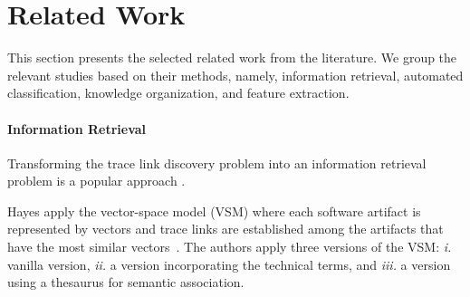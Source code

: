 \section{Related Work}
\label{sec:relwork}

This section presents the selected related work from the literature. We group the relevant studies based on their methods, namely, information retrieval, automated classification, knowledge organization, and feature extraction.


\paragraph{Information Retrieval} Transforming the trace link discovery problem into an information retrieval problem is a popular approach .  %

Hayes \etal{} apply the vector-space model (VSM) where each software artifact is represented by vectors and trace links are established among the artifacts that have the most similar vectors~\cite{hayes-2003}. The authors apply three versions of the VSM: \emph{i.} vanilla version, \emph{ii.} a version incorporating the technical terms, and \emph{iii.} a version using a thesaurus for semantic association.

